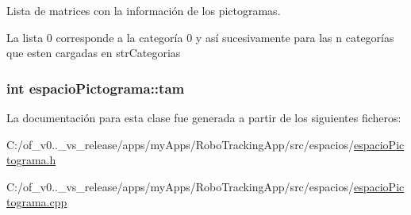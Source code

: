 Lista de matrices con la información de los pictogramas. 

La lista 0 corresponde a la categoría 0 y así sucesivamente para las n categorías que esten cargadas en str\+Categorias \hypertarget{classespacio_pictograma_aa59878d6a5fe1ae995756a0a283ec5ae}{}
\subsubsection[{tam}]{\setlength{\rightskip}{0pt plus 5cm}int espacio\+Pictograma\+::tam\hspace{0.3cm}{\ttfamily [private]}}\label{classespacio_pictograma_aa59878d6a5fe1ae995756a0a283ec5ae}


La documentación para esta clase fue generada a partir de los siguientes ficheros\+:\begin{DoxyCompactItemize}
\item 
C\+:/of\+\_\+v0..\+\_\+vs\+\_\+release/apps/my\+Apps/\+Robo\+Tracking\+App/src/espacios/\hyperlink{espacio_pictograma_8h}{espacio\+Pictograma.\+h}\item 
C\+:/of\+\_\+v0..\+\_\+vs\+\_\+release/apps/my\+Apps/\+Robo\+Tracking\+App/src/espacios/\hyperlink{espacio_pictograma_8cpp}{espacio\+Pictograma.\+cpp}\end{DoxyCompactItemize}
